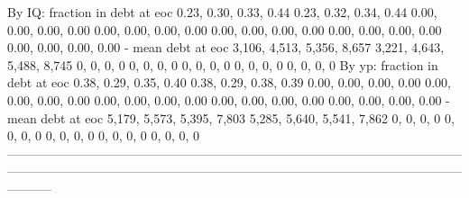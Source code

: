         By IQ: fraction in debt at eoc      0.23, 0.30, 0.33, 0.44      0.23, 0.32, 0.34, 0.44   0.00, 0.00, 0.00, 0.00     0.00, 0.00, 0.00, 0.00         0.00, 0.00, 0.00, 0.00   0.00, 0.00, 0.00, 0.00   0.00, 0.00, 0.00, 0.00
                    - mean debt at eoc  3,106, 4,513, 5,356, 8,657  3,221, 4,643, 5,488, 8,745               0, 0, 0, 0                 0, 0, 0, 0                     0, 0, 0, 0               0, 0, 0, 0               0, 0, 0, 0
        By yp: fraction in debt at eoc      0.38, 0.29, 0.35, 0.40      0.38, 0.29, 0.38, 0.39   0.00, 0.00, 0.00, 0.00     0.00, 0.00, 0.00, 0.00         0.00, 0.00, 0.00, 0.00   0.00, 0.00, 0.00, 0.00   0.00, 0.00, 0.00, 0.00
                    - mean debt at eoc  5,179, 5,573, 5,395, 7,803  5,285, 5,640, 5,541, 7,862               0, 0, 0, 0                 0, 0, 0, 0                     0, 0, 0, 0               0, 0, 0, 0               0, 0, 0, 0
-----------------------------------------------------------------------------------------------------------------------------------------------------------------------------------------------------------------------------------
